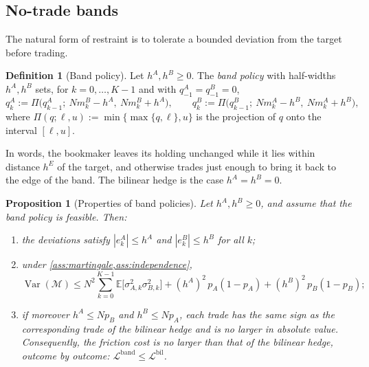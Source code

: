 \documentclass[11pt,a4paper]{article}
\theoremstyle{plain}
\newtheorem{proposition}[theorem]{Proposition}
\theoremstyle{definition}
\newtheorem{definition}[theorem]{Definition}
\theoremstyle{remark}
\newcommand{\E}{\mathbb{E}}
\newcommand{\1}{\mathbf{1}}
\newcommand{\Var}{\operatorname{Var}}
\begin{document}
\subsection{No-trade bands}

The natural form of restraint is to tolerate a bounded deviation from the target before trading.

\begin{definition}[Band policy]
\label{def:band}
Let $h^A,h^B\geq 0$. The \emph{band policy} with half-widths $h^A,h^B$ sets, for $k=0,\dots,K-1$ and with $q^A_{-1}=q^B_{-1}=0$,
\[
q^A_k := \Pi\bigl(q^A_{k-1};\ Nm^B_k - h^A,\ Nm^B_k + h^A\bigr),\qquad q^B_k := \Pi\bigl(q^B_{k-1};\ Nm^A_k - h^B,\ Nm^A_k + h^B\bigr),
\]
where $\Pi(q;\ell,u) := \min\{\max\{q,\ell\},u\}$ is the projection of $q$ onto the interval $[\ell,u]$.
\end{definition}

In words, the bookmaker leaves its holding unchanged while it lies within distance $h^E$ of the target, and otherwise trades just enough to bring it back to the edge of the band. The bilinear hedge is the case $h^A=h^B=0$.

\begin{proposition}[Properties of band policies]
\label{prop:band}
Let $h^A,h^B\geq 0$, and assume that the band policy is feasible. Then:
\begin{enumerate}[label=(\alph*)]
  \item the deviations satisfy $|e^A_k|\leq h^A$ and $|e^B_k|\leq h^B$ for all $k$;
  \item under \cref{ass:martingale,ass:independence},
  \[
  \Var(\mathcal{M})\leq N^2\sum_{k=0}^{K-1}\E\bigl[\sigma^2_{A,k}\sigma^2_{B,k}\bigr] + (h^A)^2\,p_A(1-p_A) + (h^B)^2\,p_B(1-p_B);
  \]
  \item if moreover $h^A\leq Np_B$ and $h^B\leq Np_A$, each trade has the same sign as the corresponding trade of the bilinear hedge and is no larger in absolute value. Consequently, the friction cost is no larger than that of the bilinear hedge, outcome by outcome: $\mathcal{L}^{\mathrm{band}}\leq\mathcal{L}^{\mathrm{bil}}$.
\end{enumerate}
\end{proposition}
\end{document}
